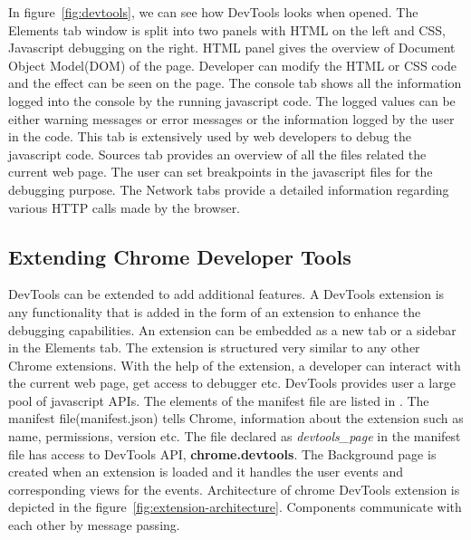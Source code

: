 In figure~\ref{fig:devtools}, we can see how DevTools looks when opened. The Elements tab window is split into two panels with HTML on the left and CSS, Javascript debugging on the right. HTML panel gives the overview of Document Object Model(DOM) of the page. Developer can modify the HTML or CSS code and the effect can be seen on the page. The console tab shows all the information logged into the console by the running javascript code. The logged values can be either warning messages or error messages or the information logged by the user in the code. This tab is extensively used by web developers to debug the javascript code. Sources tab provides an overview of all the files related the current web page. The user can set breakpoints in the javascript files for the debugging purpose. The Network tabs provide a detailed information regarding various HTTP calls made by the browser. 

\subsection{Extending Chrome Developer Tools} \label{section:extending_devtools}
DevTools can be extended to add additional features. 
A DevTools extension is any functionality that is added in the form of an extension to enhance the debugging capabilities. 
An extension can be embedded as a new tab or a sidebar in the Elements tab. 
The extension is structured very similar to any other Chrome extensions\cite{devtoolsextension}. 
With the help of the extension, a developer can interact with the current web page, get access to debugger etc. 
DevTools provides user a large pool of javascript APIs\cite{devtools}. 
The elements of the manifest file are listed in \cite{devtoolsmanifestfile}. 
The manifest file(manifest.json) tells Chrome, information about the extension such as name, permissions, version etc. 
The file declared as \textit{devtools\_page} in the manifest file has access to DevTools API, \textbf{chrome.devtools}. 
The Background page is created when an extension is loaded and it handles the user events and corresponding views for the events. 
Architecture of chrome DevTools extension is depicted in the figure~\ref{fig:extension-architecture}. 
Components communicate with each other by message passing.

